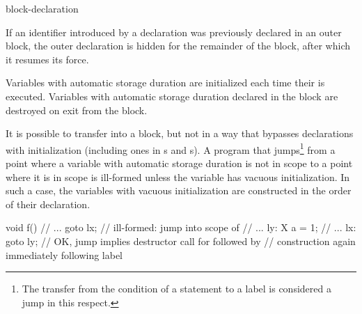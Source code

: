 \begin{bnf}
\br
    block-declaration
\end{bnf}

If an identifier introduced by a declaration was previously declared in
an outer block,
%
%
%
the outer declaration is hidden for the remainder of the block, after
which it resumes its force.

\pnum
{}%
%
Variables with automatic storage duration are
initialized each time their  is executed.
%
Variables with automatic storage duration declared in the block are
destroyed on exit from the block.

\pnum
{}%
%
It is possible to transfer into a block, but not in a way that bypasses
declarations with initialization (including ones in s
and s).
A program that jumps\footnote{The transfer from the condition of a  statement to a
 label is considered a jump in this respect.}
from a point where a variable with automatic storage duration is
not in scope to a point where it is in scope is ill-formed unless
the variable has vacuous initialization.
In such a case, the variables with vacuous initialization
are constructed in the order of their declaration.
\begin{example}
\begin{codeblock}
void f() {
  // ...
  goto lx;          // ill-formed: jump into scope of 
  // ...
ly:
  X a = 1;
  // ...
lx:
  goto ly;          // OK, jump implies destructor call for  followed by
                    // construction again immediately following label 
}
\end{codeblock}
\end{example}

